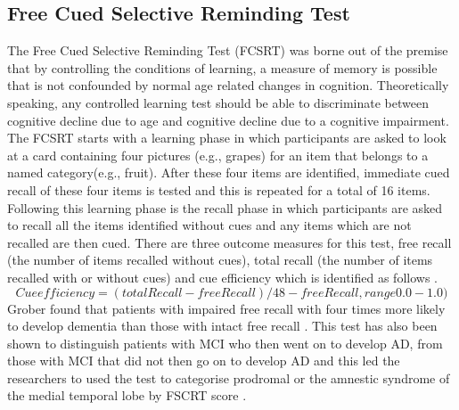 \documentclass[10pt, letterpaper, twoside, openany]{book}
\begin{document}
\subsection{Free Cued Selective Reminding Test}
The Free Cued Selective Reminding Test (FCSRT) was borne out of the premise that by controlling the conditions of learning, a measure of memory is possible that is not confounded by normal age related changes in cognition. Theoretically speaking, any controlled learning test should be able to discriminate between cognitive decline due to age and cognitive decline due to a cognitive impairment. The FCSRT starts with a learning phase in which participants are asked to look at a card containing four pictures (e.g., grapes) for an item that belongs to a named category(e.g., fruit). After these four items are identified, immediate cued recall of these four items is tested and this is repeated for a total of 16 items. Following this learning phase is the recall phase in which participants are asked to recall all the items identified without cues and any items which are not recalled are then cued. There are three outcome measures for this test, free recall (the number of items recalled without cues), total recall (the number of items recalled with or without cues) and cue efficiency which is identified as follows \cite{Grober2010}.
\begin{equation} \label{x1}
Cue efficiency = (totalRecall-freeRecall)/48-freeRecall, range 0.0-1.0)
\end{equation}
Grober found that patients with impaired free recall with four times more likely to develop dementia than those with intact free recall \cite{Grober2010}. This test has also been shown to distinguish patients with MCI who then went on to develop AD, from those with MCI that did not then go on to develop AD and this led the researchers to used the test to categorise prodromal or the amnestic syndrome of the medial temporal lobe by FSCRT score \cite{Sarazin2007}. 
\end{document}
